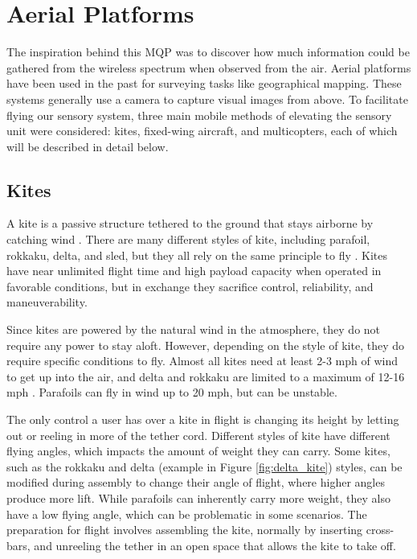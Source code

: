 \section{Aerial Platforms}
The inspiration behind this MQP was to discover how much information could be gathered from the wireless spectrum when observed from the air. Aerial platforms have been used in the past for surveying tasks like geographical mapping. \cite{geomap_patent} These systems generally use a camera to capture visual images from above. To facilitate flying our sensory system, three main mobile methods of elevating the sensory unit were considered: kites, fixed-wing aircraft, and multicopters, each of which will be described in detail below.

\subsection{Kites}
A kite is a passive structure tethered to the ground that stays airborne by catching wind \cite{kite_book}. There are many different styles of kite, including parafoil, rokkaku, delta, and sled, but they all rely on the same principle to fly \cite{kite_book} \cite{kite_iqp}. Kites have near unlimited flight time and high payload capacity when operated in favorable conditions, but in exchange they sacrifice control, reliability, and maneuverability.\par
Since kites are powered by the natural wind in the atmosphere, they do not require any power to stay aloft. However, depending on the style of kite, they do require specific conditions to fly. Almost all kites need at least 2-3 mph of wind to get up into the air, and delta and rokkaku are limited to a maximum of 12-16 mph \cite{kite_iqp}. Parafoils can fly in wind up to 20 mph, but can be unstable.\par
The only control a user has over a kite in flight is changing its height by letting out or reeling in more of the tether cord. Different styles of kite have different flying angles, which impacts the amount of weight they can carry. Some kites, such as the rokkaku and delta (example in Figure \ref{fig:delta_kite}) styles, can be modified during assembly to change their angle of flight, where higher angles produce more lift. While parafoils can inherently carry more weight, they also have a low flying angle, which can be problematic in some scenarios. The preparation for flight involves assembling the kite, normally by inserting cross-bars, and unreeling the tether in an open space that allows the kite to take off.\par
